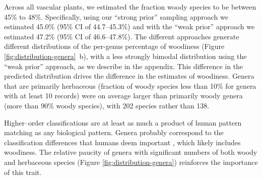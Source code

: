 \documentclass[12pt]{article}
\begin{document}



Across all vascular plants, we estimated the fraction woody species to
be between 45\% to 48\%.
Specifically, using our ``strong prior'' sampling approach we
estimated 45.0\% (95\% CI of 44.7--45.3\%) and with the ``weak prior''
approach we estimated 47.2\% (95\% CI of 46.6--47.8\%).  
% 
The different approaches generate different distributions of the
per-genus percentage of woodiness (Figure
\ref{fig:distribution-genera}~b), with a less strongly bimodal
distribution using the ``weak prior'' approach, as we describe in the
appendix.
%
This difference in the predicted distribution drives the difference in
the estimates of woodiness.  Genera that are primarily herbaceous
(fraction of woody species less than 10\% for genera with at least 10
records) were on average larger than primarily woody genera (more than
90\% woody species), with 202 species rather than 138.
%

Higher--order classifications are at least as much a product of human
pattern matching as any biological pattern.  Genera probably
correspond to the classification differences that humans deem
important \citep{scotland2004significance}, which likely includes woodiness.  
The relative paucity of genera with significant numbers of
both woody and herbaceous species (Figure
\ref{fig:distribution-genera}) reinforces the importance of this
trait.
\end{document}
